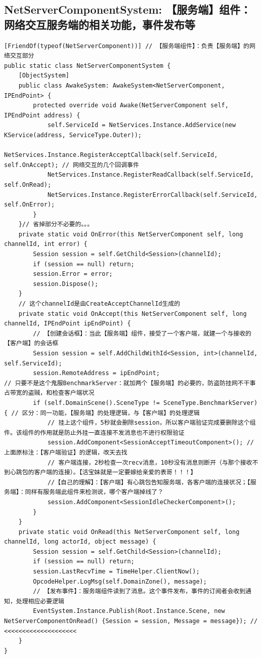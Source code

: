 \documentclass[9pt, b5paper]{article}
\begin{document}
\subsection{NetServerComponentSystem: 【服务端】组件：网络交互服务端的相关功能，事件发布等}
\label{sec-8-3}
\begin{verbatim}
[FriendOf(typeof(NetServerComponent))] // 【服务端组件】：负责【服务端】的网络交互部分
public static class NetServerComponentSystem {
    [ObjectSystem]
    public class AwakeSystem: AwakeSystem<NetServerComponent, IPEndPoint> {
        protected override void Awake(NetServerComponent self, IPEndPoint address) {
            self.ServiceId = NetServices.Instance.AddService(new KService(address, ServiceType.Outer));
            NetServices.Instance.RegisterAcceptCallback(self.ServiceId, self.OnAccept); // 网络交互的几个回调事件
            NetServices.Instance.RegisterReadCallback(self.ServiceId, self.OnRead);
            NetServices.Instance.RegisterErrorCallback(self.ServiceId, self.OnError);
        }
    }// 省掉部分不必要的。。。
    private static void OnError(this NetServerComponent self, long channelId, int error) {
        Session session = self.GetChild<Session>(channelId);
        if (session == null) return;
        session.Error = error;
        session.Dispose();
    }
    // 这个channelId是由CreateAcceptChannelId生成的
    private static void OnAccept(this NetServerComponent self, long channelId, IPEndPoint ipEndPoint) {
        // 【创建会话框】：当此【服务端】组件，接受了一个客户端，就建一个与接收的【客户端】的会话框
        Session session = self.AddChildWithId<Session, int>(channelId, self.ServiceId);
        session.RemoteAddress = ipEndPoint;
// 只要不是这个鬼服BenchmarkServer：就加两个【服务端】的必要的，防盗防挂网不干事占带宽的盗贼，和检查客户端状况
        if (self.DomainScene().SceneType != SceneType.BenchmarkServer) { // 区分：同一功能，【服务端】的处理逻辑，与【客户端】的处理逻辑 
            // 挂上这个组件，5秒就会删除session，所以客户端验证完成要删除这个组件。该组件的作用就是防止外挂一直连接不发消息也不进行权限验证
            session.AddComponent<SessionAcceptTimeoutComponent>(); // 上面原标注：【客户端验证】的逻辑，改天去找
            // 客户端连接，2秒检查一次recv消息，10秒没有消息则断开（与那个接收不到心跳包的客户端的连接）。【活宝妹就是一定要嫁给亲爱的表哥！！！】
            //【自己的理解】：【客户端】有心跳包告知服务端，各客户端的连接状况；【服务端】：同样有服务端此组件来检测说，哪个客户端掉线了？
            session.AddComponent<SessionIdleCheckerComponent>();
        }
    }
    private static void OnRead(this NetServerComponent self, long channelId, long actorId, object message) {
        Session session = self.GetChild<Session>(channelId);
        if (session == null) return;
        session.LastRecvTime = TimeHelper.ClientNow();
        OpcodeHelper.LogMsg(self.DomainZone(), message);
        // 【发布事件】：服务端组件读到了消息。这个事件发布，事件的订阅者会收到通知，处理相应必要逻辑
        EventSystem.Instance.Publish(Root.Instance.Scene, new NetServerComponentOnRead() {Session = session, Message = message}); // <<<<<<<<<<<<<<<<<<<< 
    }
}
\end{verbatim}
\end{document}
